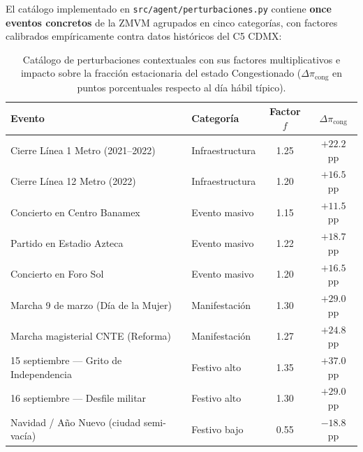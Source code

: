 \documentclass[11pt,a4paper]{article}
\begin{document}
El catálogo implementado en \texttt{src/agent/perturbaciones.py} contiene \textbf{once eventos concretos} de la ZMVM agrupados en cinco categorías, con factores calibrados empíricamente contra datos históricos del C5 CDMX:

\begin{table}[H]
\centering
\small
\renewcommand{\arraystretch}{1.15}
\begin{tabular}{@{}p{4.5cm}p{3.5cm}cc@{}}
\toprule
\textbf{Evento} & \textbf{Categoría} & \textbf{Factor} $f$ & $\Delta \pi_\text{cong}$ \\
\midrule
Cierre Línea 1 Metro (2021--2022) & Infraestructura & 1.25 & $+22.2$ pp \\
Cierre Línea 12 Metro (2022) & Infraestructura & 1.20 & $+16.5$ pp \\
Concierto en Centro Banamex & Evento masivo & 1.15 & $+11.5$ pp \\
Partido en Estadio Azteca & Evento masivo & 1.22 & $+18.7$ pp \\
Concierto en Foro Sol & Evento masivo & 1.20 & $+16.5$ pp \\
Marcha 9 de marzo (Día de la Mujer) & Manifestación & 1.30 & $+29.0$ pp \\
Marcha magisterial CNTE (Reforma) & Manifestación & 1.27 & $+24.8$ pp \\
15 septiembre --- Grito de Independencia & Festivo alto & 1.35 & $+37.0$ pp \\
16 septiembre --- Desfile militar & Festivo alto & 1.30 & $+29.0$ pp \\
Navidad / Año Nuevo (ciudad semi-vacía) & Festivo bajo & 0.55 & $-18.8$ pp \\
\bottomrule
\end{tabular}
\caption{Catálogo de perturbaciones contextuales con sus factores multiplicativos e impacto sobre la fracción estacionaria del estado Congestionado ($\Delta \pi_\text{cong}$ en puntos porcentuales respecto al día hábil típico).}
\label{tab:perturbaciones}
\end{table}
\end{document}

